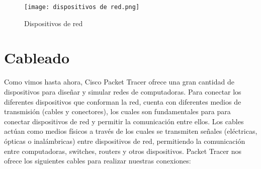 \documentclass{article}
\begin{document}
\begin{figure}[h]
  \centering
  \texttt{[image: dispositivos de red.png]}
  \caption{Dispositivos de red}
\end{figure}
\section{Cableado}
Como vimos hasta ahora, Cisco Packet Tracer ofrece una gran cantidad de dispositivos para diseñar y simular redes de computadoras. Para conectar los diferentes dispositivos que conforman la red, cuenta con diferentes medios de transmisión (cables y conectores), los cuales son fundamentales para  para conectar dispositivos de red y permitir la comunicación entre ellos. Los cables actúan como medios físicos a través de los cuales se transmiten señales (eléctricas, ópticas o inalámbricas) entre dispositivos de red, permitiendo la comunicación entre computadoras, switches, routers y otros dispositivos. Packet Tracer nos ofrece los siguientes cables para realizar nuestras conexiones:
\end{document}
